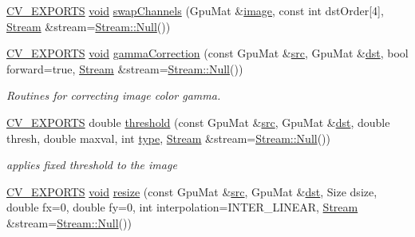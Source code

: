 \begin{DoxyCompactItemize}
\item 
\hyperlink{core_2types__c_8h_a1bf9f0e121b54272da02379cfccd0a2b}{C\-V\-\_\-\-E\-X\-P\-O\-R\-T\-S} \hyperlink{legacy_8hpp_a8bb47f092d473522721002c86c13b94e}{void} \hyperlink{namespacecv_1_1gpu_a3de8e8474bc3d66155041366d0628535}{swap\-Channels} (Gpu\-Mat \&\hyperlink{legacy_8hpp_ad62b16ab219ae2483e8a3d921c44cc97}{image}, const int dst\-Order\mbox{[}4\mbox{]}, \hyperlink{classcv_1_1gpu_1_1Stream}{Stream} \&stream=\hyperlink{classcv_1_1gpu_1_1Stream_af96c23564834f88333dcb8997df553f1}{Stream\-::\-Null}())
\item 
\hyperlink{core_2types__c_8h_a1bf9f0e121b54272da02379cfccd0a2b}{C\-V\-\_\-\-E\-X\-P\-O\-R\-T\-S} \hyperlink{legacy_8hpp_a8bb47f092d473522721002c86c13b94e}{void} \hyperlink{namespacecv_1_1gpu_a095a8ef06ce75a9646bb86437f47a5a0}{gamma\-Correction} (const Gpu\-Mat \&\hyperlink{legacy_8hpp_a371cd109b74033bc4366f584edd3dacc}{src}, Gpu\-Mat \&\hyperlink{photo__c_8h_aed13e2a25279b24dc954073233fef7a5}{dst}, bool forward=true, \hyperlink{classcv_1_1gpu_1_1Stream}{Stream} \&stream=\hyperlink{classcv_1_1gpu_1_1Stream_af96c23564834f88333dcb8997df553f1}{Stream\-::\-Null}())
\begin{DoxyCompactList}\small\item\em Routines for correcting image color gamma. \end{DoxyCompactList}\item 
\hyperlink{core_2types__c_8h_a1bf9f0e121b54272da02379cfccd0a2b}{C\-V\-\_\-\-E\-X\-P\-O\-R\-T\-S} double \hyperlink{namespacecv_1_1gpu_a63944c7054df081596be6b4cf94df871}{threshold} (const Gpu\-Mat \&\hyperlink{legacy_8hpp_a371cd109b74033bc4366f584edd3dacc}{src}, Gpu\-Mat \&\hyperlink{photo__c_8h_aed13e2a25279b24dc954073233fef7a5}{dst}, double thresh, double maxval, int \hyperlink{imgproc__c_8h_a84612d8738bf935200cf32a103d8efe1}{type}, \hyperlink{classcv_1_1gpu_1_1Stream}{Stream} \&stream=\hyperlink{classcv_1_1gpu_1_1Stream_af96c23564834f88333dcb8997df553f1}{Stream\-::\-Null}())
\begin{DoxyCompactList}\small\item\em applies fixed threshold to the image \end{DoxyCompactList}\item 
\hyperlink{core_2types__c_8h_a1bf9f0e121b54272da02379cfccd0a2b}{C\-V\-\_\-\-E\-X\-P\-O\-R\-T\-S} \hyperlink{legacy_8hpp_a8bb47f092d473522721002c86c13b94e}{void} \hyperlink{namespacecv_1_1gpu_a521d642cc1410137c0b8538ac5ccac42}{resize} (const Gpu\-Mat \&\hyperlink{legacy_8hpp_a371cd109b74033bc4366f584edd3dacc}{src}, Gpu\-Mat \&\hyperlink{photo__c_8h_aed13e2a25279b24dc954073233fef7a5}{dst}, Size dsize, double fx=0, double fy=0, int interpolation=I\-N\-T\-E\-R\-\_\-\-L\-I\-N\-E\-A\-R, \hyperlink{classcv_1_1gpu_1_1Stream}{Stream} \&stream=\hyperlink{classcv_1_1gpu_1_1Stream_af96c23564834f88333dcb8997df553f1}{Stream\-::\-Null}())

\end{DoxyCompactItemize}
